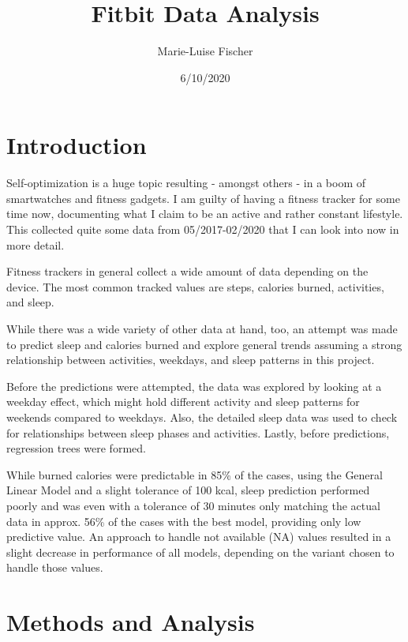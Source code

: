 \documentclass[
]{article}
\title{Fitbit Data Analysis}
\author{Marie-Luise Fischer}
\date{6/10/2020}
\begin{document}
\maketitle

{
\setcounter{tocdepth}{2}
\tableofcontents
}
\newpage

\hypertarget{introduction}{%
\section{Introduction}\label{introduction}}

Self-optimization is a huge topic resulting - amongst others - in a boom
of smartwatches and fitness gadgets. I am guilty of having a fitness
tracker for some time now, documenting what I claim to be an active and
rather constant lifestyle. This collected quite some data from
05/2017-02/2020 that I can look into now in more detail.

Fitness trackers in general collect a wide amount of data depending on
the device. The most common tracked values are steps, calories burned,
activities, and sleep.

While there was a wide variety of other data at hand, too, an attempt
was made to predict sleep and calories burned and explore general trends
assuming a strong relationship between activities, weekdays, and sleep
patterns in this project.

Before the predictions were attempted, the data was explored by looking
at a weekday effect, which might hold different activity and sleep
patterns for weekends compared to weekdays. Also, the detailed sleep
data was used to check for relationships between sleep phases and
activities. Lastly, before predictions, regression trees were formed.

While burned calories were predictable in 85\% of the cases, using the
General Linear Model and a slight tolerance of 100 kcal, sleep
prediction performed poorly and was even with a tolerance of 30 minutes
only matching the actual data in approx. 56\% of the cases with the best
model, providing only low predictive value. An approach to handle not
available (NA) values resulted in a slight decrease in performance of
all models, depending on the variant chosen to handle those values.

\newpage

\hypertarget{methods-and-analysis}{%
\section{Methods and Analysis}\label{methods-and-analysis}}
\end{document}
